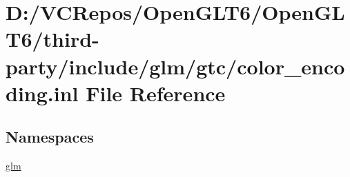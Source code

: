 \hypertarget{color__encoding_8inl}{}\section{D\+:/\+V\+C\+Repos/\+Open\+G\+L\+T6/\+Open\+G\+L\+T6/third-\/party/include/glm/gtc/color\+\_\+encoding.inl File Reference}
\label{color__encoding_8inl}
\subsection*{Namespaces}
\begin{DoxyCompactItemize}
\item 
 \mbox{\hyperlink{namespaceglm}{glm}}
\end{DoxyCompactItemize}
